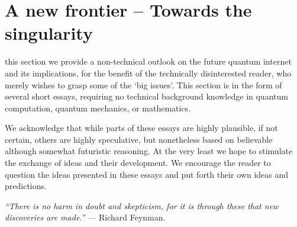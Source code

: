 %
%

\section{A new frontier -- Towards the singularity} \label{sec:outlook}  

 this section we provide a non-technical outlook on the future quantum internet and its implications, for the benefit of the technically disinterested reader, who merely wishes to grasp some of the `big issues'. This section is in the form of several short essays, requiring no technical background knowledge in quantum computation, quantum mechanics, or mathematics.

We acknowledge that while parts of these essays are highly plausible, if not certain, others are highly speculative, but nonetheless based on believable although somewhat futuristic reasoning. At the very least we hope to stimulate the exchange of ideas and their development. We encourage the reader to question the ideas presented in these essays and put forth their own ideas and predictions.

\textit{``There is no harm in doubt and skepticism, for it is through these that new discoveries are made.''} --- Richard Feynman.

%
%




%
%




%
%




%
%




%
%



